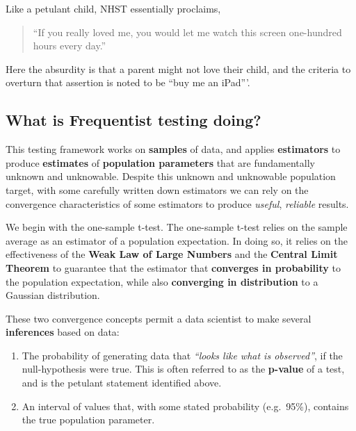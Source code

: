 \documentclass[
]{book}
\providecommand{\tightlist}{%
  \setlength{\itemsep}{0pt}\setlength{\parskip}{0pt}}
\theoremstyle{definition}
\theoremstyle{definition}
\theoremstyle{definition}
\theoremstyle{definition}
\theoremstyle{remark}
\begin{document}
Like a petulant child, NHST essentially proclaims,

\begin{quote}
``If you really loved me, you would let me watch this screen one-hundred hours every day.''
\end{quote}

Here the absurdity is that a parent might not love their child, and the criteria to overturn that assertion is noted to be ``buy me an iPad'''.

\hypertarget{what-is-frequentist-testing-doing}{%
\subsection*{What is Frequentist testing doing?}\label{what-is-frequentist-testing-doing}}

This testing framework works on \textbf{samples} of data, and applies \textbf{estimators} to produce \textbf{estimates} of \textbf{population parameters} that are fundamentally unknown and unknowable. Despite this unknown and unknowable population target, with some carefully written down estimators we can rely on the convergence characteristics of some estimators to produce \emph{useful}, \emph{reliable} results.

We begin with the one-sample t-test. The one-sample t-test relies on the sample average as an estimator of a population expectation. In doing so, it relies on the effectiveness of the \textbf{Weak Law of Large Numbers} and the \textbf{Central Limit Theorem} to guarantee that the estimator that \textbf{converges in probability} to the population expectation, while also \textbf{converging in distribution} to a Gaussian distribution.

These two convergence concepts permit a data scientist to make several \textbf{inferences} based on data:

\begin{enumerate}
\def\labelenumi{\arabic{enumi}.}
\tightlist
\item
  The probability of generating data that \emph{``looks like what is observed''}, if the null-hypothesis were true. This is often referred to as the \textbf{p-value} of a test, and is the petulant statement identified above.
\item
  An interval of values that, with some stated probability (e.g.~95\%), contains the true population parameter.
\end{enumerate}
\end{document}
